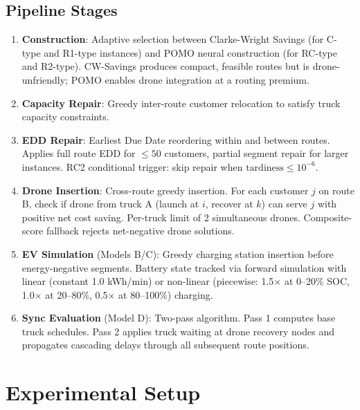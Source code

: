 \documentclass[11pt,a4paper]{article}
\begin{document}
\subsection{Pipeline Stages}

\begin{enumerate}
    \item \textbf{Construction}: Adaptive selection between Clarke-Wright Savings
          (for C-type and R1-type instances) and POMO neural construction (for RC-type
          and R2-type). CW-Savings produces compact, feasible routes but is
          drone-unfriendly; POMO enables drone integration at a routing premium.
    \item \textbf{Capacity Repair}: Greedy inter-route customer relocation to satisfy
          truck capacity constraints.
    \item \textbf{EDD Repair}: Earliest Due Date reordering within and between routes.
          Applies full route EDD for $\leq 50$ customers, partial segment repair for
          larger instances. RC2 conditional trigger: skip repair when $\text{tardiness}
          \leq 10^{-6}$.
    \item \textbf{Drone Insertion}: Cross-route greedy insertion. For each customer $j$
          on route B, check if drone from truck A (launch at $i$, recover at $k$) can
          serve $j$ with positive net cost saving. Per-truck limit of 2 simultaneous
          drones. Composite-score fallback rejects net-negative drone solutions.
    \item \textbf{EV Simulation} (Models B/C): Greedy charging station insertion before
          energy-negative segments. Battery state tracked via forward simulation with
          linear (constant 1.0 kWh/min) or non-linear (piecewise: 1.5$\times$ at
          0--20\% SOC, 1.0$\times$ at 20--80\%, 0.5$\times$ at 80--100\%) charging.
    \item \textbf{Sync Evaluation} (Model D): Two-pass algorithm. Pass 1 computes base
          truck schedules. Pass 2 applies truck waiting at drone recovery nodes and
          propagates cascading delays through all subsequent route positions.
\end{enumerate}

\section{Experimental Setup}
\end{document}
